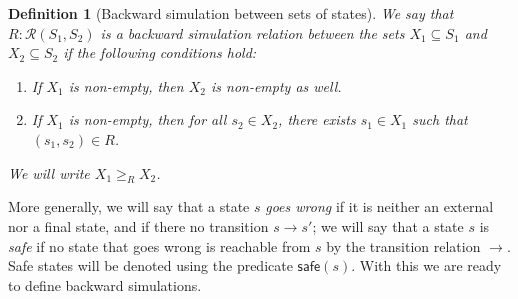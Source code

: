 \documentclass{article}
\newtheorem{definition}{Definition}
\newcommand{\kw}[1]{\ensuremath{ \mathsf{#1} }}
\begin{document}
\begin{definition}[Backward simulation between sets of states]
We say that $R : \mathcal{R}(S_1, S_2)$ is a
\emph{backward simulation relation
  between the sets $X_1 \subseteq S_1$ and  $X_2 \subseteq S_2$}
if the following conditions hold:
\begin{enumerate}
\item
  If $X_1$ is non-empty,
  then $X_2$ is non-empty as well.
\item
  If $X_1$ is non-empty,
  then for all $s_2 \in X_2$,
  there exists $s_1 \in X_1$
  such that $(s_1, s_2) \in R$.
\end{enumerate}
We will write $X_1 \ge_R X_2$.
\end{definition}

More generally,
we will say that a state $s$ \emph{goes wrong}
if it is neither an external nor a final state,
and if there no transition $s \rightarrow s'$;
we will say that a state $s$ is \emph{safe}
if no state that goes wrong is reachable from $s$
by the transition relation $\rightarrow$.
Safe states will be denoted using the predicate $\kw{safe}(s)$.
With this we are ready to define backward simulations.
\end{document}
